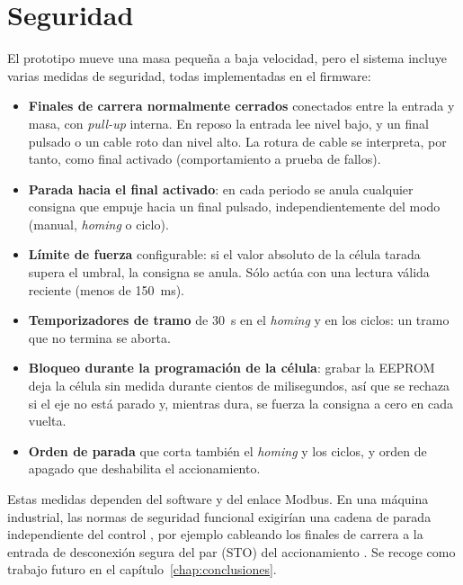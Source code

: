 \section{Seguridad}
\label{sec:arq-seguridad}

El prototipo mueve una masa pequeña a baja velocidad, pero el sistema incluye varias medidas de
seguridad, todas implementadas en el firmware:

\begin{itemize}
  \item \textbf{Finales de carrera normalmente cerrados} conectados entre la entrada y masa, con
        \emph{pull-up} interna. En reposo la entrada lee nivel bajo, y un final pulsado o un cable
        roto dan nivel alto. La rotura de cable se interpreta, por tanto, como final activado
        (comportamiento a prueba de fallos).
  \item \textbf{Parada hacia el final activado}: en cada periodo se anula cualquier consigna que
        empuje hacia un final pulsado, independientemente del modo (manual, \emph{homing} o ciclo).
  \item \textbf{Límite de fuerza} configurable: si el valor absoluto de la célula tarada supera el
        umbral, la consigna se anula. Sólo actúa con una lectura válida reciente
        (menos de \SI{150}{\milli\second}).
  \item \textbf{Temporizadores de tramo} de \SI{30}{\second} en el \emph{homing} y en los ciclos:
        un tramo que no termina se aborta.
  \item \textbf{Bloqueo durante la programación de la célula}: grabar la EEPROM deja la célula sin
        medida durante cientos de milisegundos, así que se rechaza si el eje no está parado y,
        mientras dura, se fuerza la consigna a cero en cada vuelta.
  \item \textbf{Orden de parada} que corta también el \emph{homing} y los ciclos, y orden de
        apagado que deshabilita el accionamiento.
\end{itemize}

Estas medidas dependen del software y del enlace Modbus. En una máquina industrial, las normas de
seguridad funcional exigirían una cadena de parada independiente del control
\cite{iso13849}, por ejemplo cableando los finales de carrera a la entrada de desconexión segura del
par (STO) del accionamiento \cite{iec61800}. Se recoge como trabajo futuro en el
capítulo~\ref{chap:conclusiones}.
